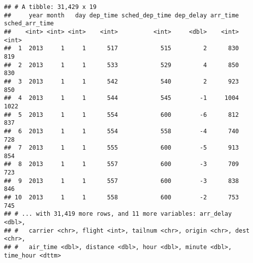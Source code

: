 \documentclass[
]{article}
\begin{document}
\begin{verbatim}
## # A tibble: 31,429 x 19
##     year month   day dep_time sched_dep_time dep_delay arr_time sched_arr_time
##    <int> <int> <int>    <int>          <int>     <dbl>    <int>          <int>
##  1  2013     1     1      517            515         2      830            819
##  2  2013     1     1      533            529         4      850            830
##  3  2013     1     1      542            540         2      923            850
##  4  2013     1     1      544            545        -1     1004           1022
##  5  2013     1     1      554            600        -6      812            837
##  6  2013     1     1      554            558        -4      740            728
##  7  2013     1     1      555            600        -5      913            854
##  8  2013     1     1      557            600        -3      709            723
##  9  2013     1     1      557            600        -3      838            846
## 10  2013     1     1      558            600        -2      753            745
## # ... with 31,419 more rows, and 11 more variables: arr_delay <dbl>,
## #   carrier <chr>, flight <int>, tailnum <chr>, origin <chr>, dest <chr>,
## #   air_time <dbl>, distance <dbl>, hour <dbl>, minute <dbl>, time_hour <dttm>
\end{verbatim}
\end{document}
